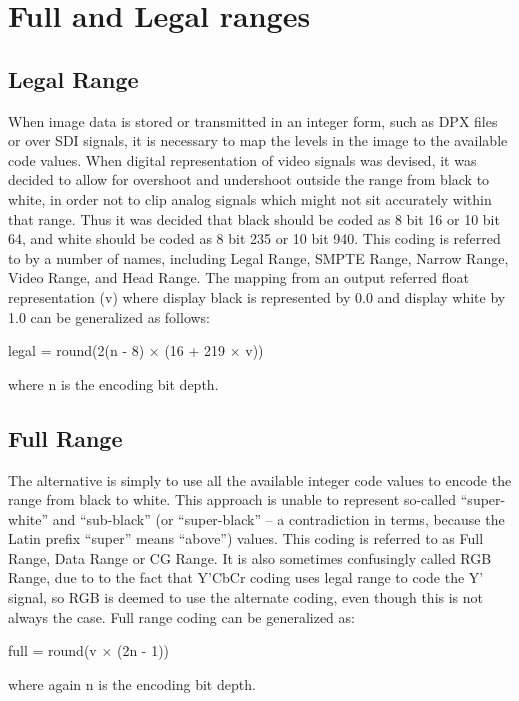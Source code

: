 \section{Full and Legal ranges}%
\label{sec:full-and-legal-ranges}

\subsection{Legal Range}%
\label{subsec:legal-range}

When image data is stored or transmitted in an integer form, such as DPX files or over SDI signals, it is necessary to map the levels in the image to the available code values. When digital representation of video signals was devised, it was decided to allow for overshoot and undershoot outside the range from black to white, in order not to clip analog signals which might not sit accurately within that range. Thus it was decided that black should be coded as 8 bit 16 or 10 bit 64, and white should be coded as 8 bit 235 or 10 bit 940. This coding is referred to by a number of names, including Legal Range, SMPTE Range, Narrow Range, Video Range, and Head Range. The mapping from an output referred float representation (v) where display black is represented by 0.0 and display white by 1.0 can be generalized as follows:

	legal = round(2(n - 8) × (16 + 219 × v))

where n is the encoding bit depth.

\subsection{Full Range}%
\label{subsec:full-range}

The alternative is simply to use all the available integer code values to encode the range from black to white. This approach is unable to represent so-called “super-white” and “sub-black” (or “super-black” – a contradiction in terms, because the Latin prefix “super” means “above”) values. This coding is referred to as Full Range, Data Range or CG Range. It is also sometimes confusingly called RGB Range, due to to the fact that Y'CbCr coding uses legal range to code the Y' signal, so RGB is deemed to use the alternate coding, even though this is not always the case. Full range coding can be generalized as:

	full = round(v × (2n - 1))

where again n is the encoding bit depth.

